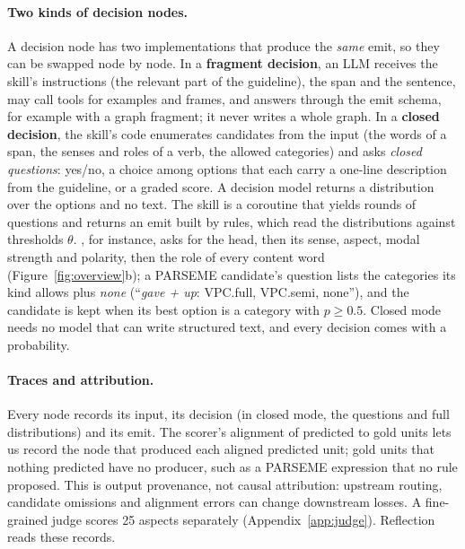 \paragraph{Two kinds of decision nodes.}
\label{sec:decisions}
A decision node has two implementations that produce the \emph{same} emit, so they can be swapped node by node. In a \textbf{fragment decision}, an LLM receives the skill's instructions (the relevant part of the guideline), the span and the sentence, may call tools for examples and frames, and answers through the emit schema, for example with a graph fragment; it never writes a whole graph.
In a \textbf{closed decision}, the skill's code enumerates candidates from the input (the words of a span, the senses and roles of a verb, the allowed categories) and asks \emph{closed questions}: yes/no, a choice among options that each carry a one-line description from the guideline, or a graded score. A decision model returns a distribution over the options and no text. The skill is a coroutine that yields rounds of questions and returns an emit built by rules, which read the distributions against thresholds $\theta$. , for instance, asks for the head, then its sense, aspect, modal strength and polarity, then the role of every content word (Figure~\ref{fig:overview}b); a PARSEME candidate's question lists the categories its kind allows plus \emph{none} (``\emph{gave + up}: VPC.full, VPC.semi, none''), and the candidate is kept when its best option is a category with $p\geq 0.5$. Closed mode needs no model that can write structured text, and every decision comes with a probability.

\paragraph{Traces and attribution.}
\label{sec:trace}
Every node records its input, its decision (in closed mode, the questions and full distributions) and its emit. The scorer's alignment of predicted to gold units lets us record the node that produced each aligned predicted unit; gold units that nothing predicted have no producer, such as a PARSEME expression that no rule proposed. This is output provenance, not causal attribution: upstream routing, candidate omissions and alignment errors can change downstream losses. A fine-grained \umr judge scores 25 aspects separately (Appendix~\ref{app:judge}). Reflection reads these records.
